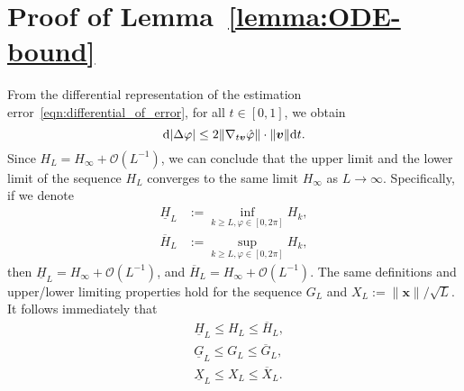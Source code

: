 \documentclass[a4paper,12pt]{article}
\begin{document}
\section*{Proof of Lemma~\ref{lemma:ODE-bound}}
From the differential representation of the estimation error~\eqref{eqn:differential_of_error}, for all $t\in[0,1]$, we obtain 
\begin{equation}
    {\rm d}|\Delta\varphi| \leq 2\|\nabla_{t{\bm v}}\hat{\varphi}\|\cdot \|{\bm v}\|{\rm d}t.
\end{equation}
Since $H_L = H_\infty + \mathcal{O}(L^{-1})$, we can conclude that the upper limit and the lower limit of the sequence $H_L$ converges to the same limit $H_\infty$ as $L\to\infty$. Specifically, if we denote 
\begin{equation}
    \begin{aligned}
    \underline{H}_L &:= \inf_{k\geq L, \varphi\in[0,2\pi]}{H_k}, \\
    \overline{H}_L &:= \sup_{k\geq L, \varphi\in[0,2\pi]}{H_k}, 
    \end{aligned}
\end{equation}
then $\underline{H}_L = H_\infty+\mathcal{O}(L^{-1})$, and $\overline{H}_L = H_\infty+\mathcal{O}(L^{-1})$. The same definitions and upper/lower limiting properties hold for the sequence $G_L$ and $X_L := \|{\bm x}\|/\sqrt{L}$. It follows immediately that 
\begin{equation}
    \begin{aligned}
        & \underline{H}_L \leq H_L \leq \overline{H}_L, \\
        & \underline{G}_L \leq G_L \leq \overline{G}_L, \\
        & \underline{X}_L \leq X_L \leq \overline{X}_L. 
    \end{aligned}
\end{equation}
\end{document}
